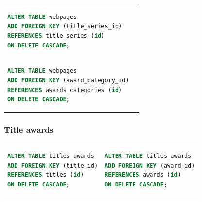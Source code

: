 \documentclass[doubleside, titlepage]{article}
\begin{document}
\begin{tabular}{ ll }
\begin{minipage}{3in}
\begin{lstlisting}[language=SQL,showspaces=false,basicstyle=\ttfamily,numberstyle=\tiny,commentstyle=\color{gray}
        ]
ALTER TABLE webpages
ADD FOREIGN KEY (title_series_id)
REFERENCES title_series (id)
ON DELETE CASCADE;
\end{lstlisting}
\end{minipage}
 \\
\begin{minipage}{3in}
\begin{lstlisting}[language=SQL,showspaces=false,basicstyle=\ttfamily,numberstyle=\tiny,commentstyle=\color{gray}
        ]
ALTER TABLE webpages
ADD FOREIGN KEY (award_category_id)
REFERENCES awards_categories (id)
ON DELETE CASCADE;
\end{lstlisting}
\end{minipage}
\end{tabular}

\subsubsection{Title awards}
\begin{tabular}{ ll }
\begin{minipage}{3in}
\begin{lstlisting}[language=SQL,showspaces=false,basicstyle=\ttfamily,numberstyle=\tiny,commentstyle=\color{gray}
        ]
ALTER TABLE titles_awards
ADD FOREIGN KEY (title_id)
REFERENCES titles (id)
ON DELETE CASCADE;
\end{lstlisting}
\end{minipage}
 &
\begin{minipage}{3in}
\begin{lstlisting}[language=SQL,showspaces=false,basicstyle=\ttfamily,numberstyle=\tiny,commentstyle=\color{gray}
        ]
ALTER TABLE titles_awards
ADD FOREIGN KEY (award_id)
REFERENCES awards (id)
ON DELETE CASCADE;
\end{lstlisting}
\end{minipage}
\end{tabular}
\end{document}

